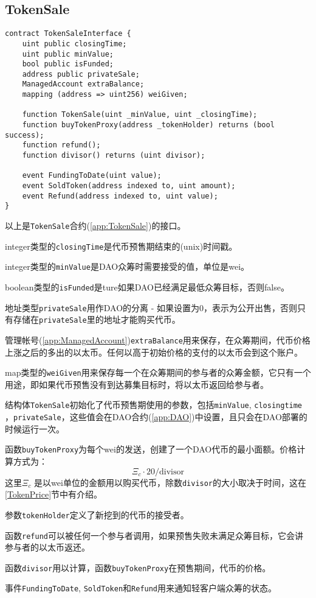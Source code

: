 \documentclass[9pt,oneside]{amsart}
\begin{document}
\subsection{TokenSale}
\begin{verbatim}
contract TokenSaleInterface {
    uint public closingTime;   
    uint public minValue;  
    bool public isFunded;   
    address public privateSale;
    ManagedAccount extraBalance;
    mapping (address => uint256) weiGiven;

    function TokenSale(uint _minValue, uint _closingTime);
    function buyTokenProxy(address _tokenHolder) returns (bool success);
    function refund();
    function divisor() returns (uint divisor);

    event FundingToDate(uint value);
    event SoldToken(address indexed to, uint amount);
    event Refund(address indexed to, uint value);
}
\end{verbatim}
\begin{multicols}{2}

以上是\verb|TokenSale|合约(\ref{app:TokenSale})的接口。

integer类型的\verb|closingTime|是代币预售期结束的(unix)时间戳。

integer类型的\verb|minValue|是DAO众筹时需要接受的值，单位是wei。

boolean类型的\verb|isFunded|是ture如果DAO已经满足最低众筹目标，否则false。

地址类型\verb|privateSale|用作DAO的分离 - 如果设置为0，表示为公开出售，否则只有存储在\verb|privateSale|里的地址才能购买代币。

管理帐号(\ref{app:ManagedAccount})\verb|extraBalance|用来保存，在众筹期间，代币价格上涨之后的多出的以太币。任何以高于初始价格的支付的以太币会到这个账户。

map类型的\verb|weiGiven|用来保存每一个在众筹期间的参与者的众筹金额，它只有一个用途，即如果代币预售没有到达募集目标时，将以太币返回给参与者。

结构体\verb|TokenSale|初始化了代币预售期使用的参数，包括\verb|minValue|, \verb|closingtime| ，\verb|privateSale|，这些值会在DAO合约(\ref{app:DAO})中设置，且只会在DAO部署的时候运行一次。

函数\verb|buyTokenProxy|为每个wei的发送，创建了一个DAO代币的最小面额。价格计算方式为：$$\Xi_c \cdot 20 / \text{divisor}$$
这里$\Xi_c$ 是以wei单位的金额用以购买代币，除数\verb|divisor|的大小取决于时间，这在\ref{TokenPrice}节中有介绍。

参数\verb|tokenHolder|定义了新挖到的代币的接受者。

函数\verb|refund|可以被任何一个参与者调用，如果预售失败未满足众筹目标，它会讲参与者的以太币返还。

函数\verb|divisor|用以计算，函数\verb|buyTokenProxy|在预售期间，代币的价格。

事件\verb|FundingToDate|, \verb|SoldToken|和\verb|Refund|用来通知轻客户端众筹的状态。
\end{multicols}
\end{document}
